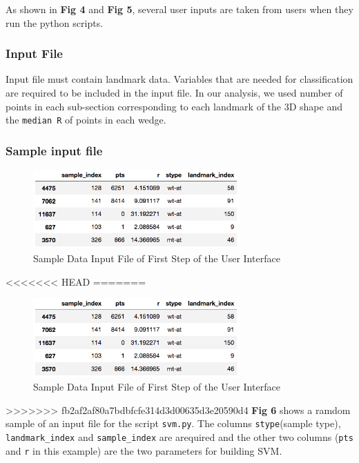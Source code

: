 \documentclass[10pt,letterpaper]{article}
\begin{document}
As shown in \textbf{Fig 4} and \textbf{Fig 5}, several user inputs are
taken from users when they run the python scripts.

\subsubsection{Input File}\label{input-file}

Input file must contain landmark data. Variables that are needed for
classification are required to be included in the input file. In our
analysis, we used number of points in each sub-section corresponding to
each landmark of the 3D shape and the \texttt{median\ R} of points in
each wedge.

\subsubsection{Sample input file}\label{sample-input-file}

\begin{figure}[h]

{\centering \includegraphics[width=300px]{figures/Figure3} 

}

\caption{Sample Data Input File of First Step of the User Interface}\label{fig:inputdata}
\end{figure}

<<<<<<< HEAD
=======
\begin{figure}[h]

{\centering \includegraphics[width=300px]{figures/Figure3} 

}

\caption{Sample Data Input File of First Step of the User Interface}\label{fig:inputdata2}
\end{figure}

>>>>>>> fb2af2af80a7bdbfcfe314d3d00635d3e20590d4
\textbf{Fig 6} shows a ramdom sample of an input file for the script
\texttt{svm.py}. The columns \texttt{stype}(sample type),
\texttt{landmark\_index} and \texttt{sample\_index} are arequired and
the other two columns (\texttt{pts} and \texttt{r} in this example) are
the two parameters for building SVM.
\end{document}
